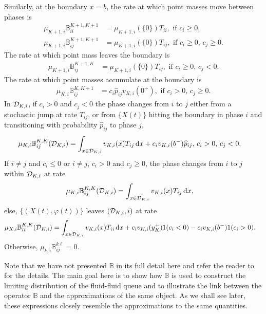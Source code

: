 Similarly, at the boundary \(x=b\), the rate at which point masses move between phases is 
\begin{align*}
	\mu_{K+1,i}\mathbb B_{ii}^{{K+1},{K+1}} &= \mu_{K+1,i}(\{0\})T_{ii}, \mbox{ if }c_i\geq 0,\,\\
	\mu_{K+1,i}\mathbb B_{ij}^{{K+1},{K+1}} &= \mu_{K+1,i}(\{0\})T_{ij},\mbox{ if }c_i\geq 0,\,c_j\geq 0.
	\end{align*}
	The rate at which point mass leaves the boundary is
	\begin{align*}
	\mu_{K+1,i}\mathbb B_{ij}^{{K+1},K} &= \mu_{K+1,i}(\{0\})T_{ij},\mbox{ if }c_i\geq 0,\,c_j<0.
	\end{align*}
	The rate at which point masses accumulate at the boundary is 
	\begin{align*}
	\mu_{K,i}\mathbb B_{ij}^{K,{K+1}} &= c_i\widehat p_{ij}v_{K,i}(0^+),\mbox{ if }c_i> 0,\,c_j\geq 0.
	\end{align*}
	In \(\mathcal{D}_{K,i}\), if \(c_i>0\) and \(c_j<0\) the phase changes from \(i\) to \(j\) either from a stochastic jump at rate \(T_{ij}\), or from \(\{X(t)\}\) hitting the boundary in phase \(i\) and transitioning with probability \(\widehat p_{ij}\) to phase \(j\),
	\begin{align*}
	\mu_{K,i}\mathbb B_{ij}^{K,K}(\mathcal{D}_{K,i})&=\int_{x\in\mathcal{D}_{K,i}}v_{K,i}(x)T_{ij}\, \mathrm{d} x + c_iv_{K,i}(b^-)\widehat p_{ij},\,c_i>0,\,c_j<0.
	\end{align*}
	If \(i\neq j\) and \(c_i\leq 0\) or \(i\neq j\), \(c_i>0\) and \(c_j\geq 0\), the phase changes from \(i\) to \(j\) within \(\mathcal{D}_{K,i}\) at rate
	\begin{align*}
	\mu_{K,i}\mathbb B_{ij}^{K,K}(\mathcal{D}_{K,i})&=\int_{x\in\mathcal{D}_{K,i}}v_{K,i}(x)T_{ij}\, \mathrm{d} x,
	\end{align*}
	else, \(\{(X(t),\varphi(t))\}\) leaves \((\mathcal{D}_{K,i},i)\) at rate
	\begin{align*}
	\mu_{K,i}\mathbb B_{ii}^{K,K}(\mathcal{D}_{K,i})&=\int_{x\in\mathcal{D}_{K,i}}v_{K,i}(x)T_{ii}\, \mathrm{d} x + c_iv_{K,i}(y_K^+)1{(c_i< 0)} - c_iv_{K,i}(b^-)1{(c_i> 0)}.
\end{align*}
Otherwise, \(\mu_{k,i}\mathbb B_{ij}^{k\ell}=0\).

Note that we have not presented \(\mathbb B\) in its full detail here and refer the reader to \citep{bo2014} for the details. The main goal here is to show how \(\mathbb B\) is used to construct the limiting distribution of the fluid-fluid queue and to illustrate the link between the operator \(\mathbb B\) and the approximations of the same object. As we shall see later, these expressions closely resemble the approximations to the same quantities. 


